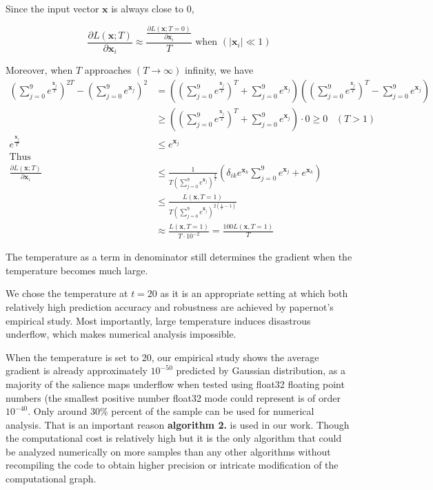 \documentclass{article}
\begin{document}
Since the input vector $\mathbf{x}$ is always close to 0,

\begin{equation}
	\frac{\partial L(\mathbf{x};T)}{\partial \mathbf{x}_i}
	\approx \frac{\frac{\partial L(\mathbf{x};T=0)}{\partial \mathbf{x}_i}}{T} \text{ when } (\mid \mathbf{x}_i \mid \ll 1)
\end{equation}

Moreover, when $T$ approaches $(T \rightarrow \infty)$ infinity, we have 
\begin{align*}
	(\sum_{j=0}^9 e^{\frac{\mathbf{x}_j}{T}})^{2T} -
	(\sum_{j=0}^9 e^{\mathbf{x}_j})^{2}
	&=((\sum_{j=0}^9 e^{\frac{\mathbf{x}_j}{T}})^T+
	\sum_{j=0}^9 e^{\mathbf{x}_j})((\sum_{j=0}^9 e^{\frac{\mathbf{x}_j}{T}})^T-\sum_{j=0}^9 e^{\mathbf{x}_j})\\
	&\ge((\sum_{j=0}^9 e^{\frac{\mathbf{x}_j}{T}})^T+
	\sum_{j=0}^9 e^{\mathbf{x}_j})\cdot 0 \ge 0 \hspace{10pt} (T > 1)\\
	e^{\frac{\mathbf{x}_j}{T}} &\le e^{\mathbf{x}_j}\\
	\text{Thus}\hspace{3cm} &\\
	\frac{\partial L(\mathbf{x};T)}{\partial \mathbf{x}_i} &\le 
	\frac{1}{T(\sum_{j=0}^9 e^{\mathbf{x}_j})^{\frac{2}{T}}} (
	\delta_{ik} e^{\mathbf{x}_k}
	\sum_{j=0}^9 e^{\mathbf{x}_j}+
	e^{\mathbf{x}_k} )\\
	&\le \frac{L(\mathbf{x},T=1)}{T(\sum_{j=0}^9 e^{\mathbf{x}_j})^{2(\frac{1}{T}-1)}}\\
	&\approx 
	\frac{L(\mathbf{x},T=1)}{T\cdot 10^{-2}} = 
	\frac{100L(\mathbf{x},T=1)}{T}
\end{align*}

The temperature as a term in denominator still determines the gradient when the temperature becomes much large.

We chose the temperature at $t=20$ as it is an appropriate setting at which both relatively high prediction accuracy and robustness are achieved by papernot's empirical study\cite{Papernot}. Most importantly, large temperature induces disastrous underflow, which makes numerical analysis impossible. 

When the temperature is set to 20, our empirical study shows the average gradient is already approximately $10^{-50}$ predicted by Gaussian distribution, as a majority of the salience maps underflow when tested using float32 floating point numbers (the smallest positive number float32 mode could represent is of order $10^{-40}$. Only around $30\%$ percent of the sample can be used for numerical analysis. That is an important reason \textbf{algorithm 2.} is used in our work. 
Though the computational cost is relatively high but it is the only algorithm that could be analyzed numerically on more samples than any other algorithms without recompiling the code to obtain higher precision or intricate modification of the computational graph.
\end{document}
